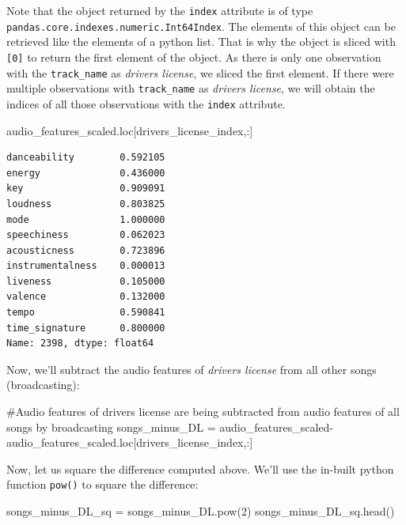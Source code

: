 \documentclass[
  letterpaper,
  DIV=11,
  numbers=noendperiod]{scrreprt}
\newenvironment{Shaded}{\begin{snugshade}}{\end{snugshade}}
\newcommand{\BuiltInTok}[1]{\textcolor[rgb]{0.00,0.23,0.31}{#1}}
\newcommand{\CommentTok}[1]{\textcolor[rgb]{0.37,0.37,0.37}{#1}}
\newcommand{\DecValTok}[1]{\textcolor[rgb]{0.68,0.00,0.00}{#1}}
\newcommand{\NormalTok}[1]{\textcolor[rgb]{0.00,0.23,0.31}{#1}}
\newcommand{\OperatorTok}[1]{\textcolor[rgb]{0.37,0.37,0.37}{#1}}
\begin{document}
Note that the object returned by the \texttt{index} attribute is of type
\texttt{pandas.core.indexes.numeric.Int64Index}. The elements of this
object can be retrieved like the elements of a python list. That is why
the object is sliced with \texttt{{[}0{]}} to return the first element
of the object. As there is only one observation with the
\texttt{track\_name} as \emph{drivers license}, we sliced the first
element. If there were multiple observations with \texttt{track\_name}
as \emph{drivers license}, we will obtain the indices of all those
observations with the \texttt{index} attribute.

\begin{Shaded}
\begin{Highlighting}[]
\NormalTok{audio\_features\_scaled.loc[drivers\_license\_index,:]}
\end{Highlighting}
\end{Shaded}

\begin{verbatim}
danceability        0.592105
energy              0.436000
key                 0.909091
loudness            0.803825
mode                1.000000
speechiness         0.062023
acousticness        0.723896
instrumentalness    0.000013
liveness            0.105000
valence             0.132000
tempo               0.590841
time_signature      0.800000
Name: 2398, dtype: float64
\end{verbatim}

Now, we'll subtract the audio features of \emph{drivers license} from
all other songs (broadcasting):

\begin{Shaded}
\begin{Highlighting}[]
\CommentTok{\#Audio features of drivers license are being subtracted from audio features of all songs by broadcasting}
\NormalTok{songs\_minus\_DL }\OperatorTok{=}\NormalTok{ audio\_features\_scaled}\OperatorTok{{-}}\NormalTok{audio\_features\_scaled.loc[drivers\_license\_index,:]}
\end{Highlighting}
\end{Shaded}

Now, let us square the difference computed above. We'll use the in-built
python function \texttt{pow()} to square the difference:

\begin{Shaded}
\begin{Highlighting}[]
\NormalTok{songs\_minus\_DL\_sq }\OperatorTok{=}\NormalTok{ songs\_minus\_DL.}\BuiltInTok{pow}\NormalTok{(}\DecValTok{2}\NormalTok{)}
\NormalTok{songs\_minus\_DL\_sq.head()}
\end{Highlighting}
\end{Shaded}
\end{document}
